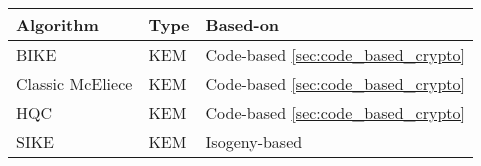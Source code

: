 \begin{tabular}{|l|l|l|}
  \hline
  Algorithm        & Type & Based-on                               \\
  \hline
  BIKE             & KEM  & Code-based \ref{sec:code_based_crypto} \\
  Classic McEliece & KEM  & Code-based \ref{sec:code_based_crypto} \\
  HQC              & KEM  & Code-based \ref{sec:code_based_crypto} \\
  SIKE             & KEM  & Isogeny-based                          \\
  \hline
\end{tabular}